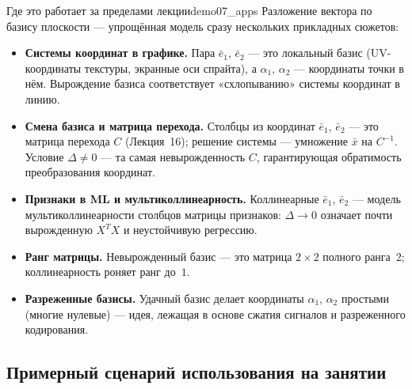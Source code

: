 \begin{remarkIT}{Где это работает за пределами лекции}{demo07_apps}
  Разложение вектора по базису плоскости --- упрощённая модель сразу
  нескольких прикладных сюжетов:
  \begin{itemize}
    \item \textbf{Системы координат в графике.} Пара $\bar{e}_1$,
      $\bar{e}_2$ --- это локальный базис (UV-координаты текстуры,
      экранные оси спрайта), а $\alpha_1$, $\alpha_2$ --- координаты
      точки в нём. Вырождение базиса соответствует «схлопыванию» системы
      координат в линию.
    \item \textbf{Смена базиса и матрица перехода.} Столбцы из координат
      $\bar{e}_1$, $\bar{e}_2$ --- это матрица перехода $C$ (Лекция~16);
      решение системы --- умножение $\bar{x}$ на $C^{-1}$. Условие
      $\Delta\neq 0$ --- та самая невырожденность $C$, гарантирующая
      обратимость преобразования координат.
    \item \textbf{Признаки в ML и мультиколлинеарность.} Коллинеарные
      $\bar{e}_1$, $\bar{e}_2$ --- модель мультиколлинеарности столбцов
      матрицы признаков: $\Delta\to 0$ означает почти вырожденную
      $X^TX$ и неустойчивую регрессию.
    \item \textbf{Ранг матрицы.} Невырожденный базис --- это матрица
      $2\times 2$ полного ранга~$2$; коллинеарность роняет ранг до~$1$.
    \item \textbf{Разреженные базисы.} Удачный базис делает координаты
      $\alpha_1$, $\alpha_2$ простыми (многие нулевые) --- идея,
      лежащая в основе сжатия сигналов и разреженного кодирования.
  \end{itemize}
\end{remarkIT}

\subsection*{Примерный сценарий использования на занятии}


